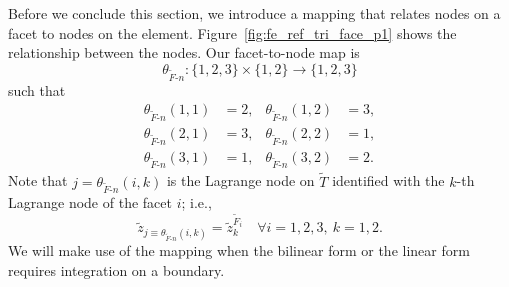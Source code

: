 Before we conclude this section, we introduce a mapping that relates nodes on a facet to nodes on the element. Figure~\ref{fig:fe_ref_tri_face_p1} shows the relationship between the nodes. Our facet-to-node map is 
\begin{equation*}
  \theta_{\tilde F\text{-}n} : \{ 1,2,3 \} \times \{ 1,2 \} \to \{1,2,3\}
\end{equation*}
such that
\begin{align*}
  \theta_{\tilde F\text{-}n}(1,1) &= 2, &   \theta_{\tilde F\text{-}n}(1,2) &= 3, \\
  \theta_{\tilde F\text{-}n}(2,1) &= 3, &   \theta_{\tilde F\text{-}n}(2,2) &= 1, \\
  \theta_{\tilde F\text{-}n}(3,1) &= 1, &   \theta_{\tilde F\text{-}n}(3,2) &= 2.
\end{align*}
Note that $j = \theta_{\tilde F\text{-}n}(i,k)$ is the Lagrange node on $\tilde T$ identified with the $k$-th Lagrange node of the facet $i$; i.e.,
\begin{equation*}
  \tilde z_{j \equiv\theta_{\tilde F\text{-}n}(i,k)}  = \tilde z^{\tilde F_i}_k \quad \forall i =1,2,3, \ k = 1,2.
\end{equation*}
We will make use of the mapping when the bilinear form or the linear form requires integration on a boundary.


